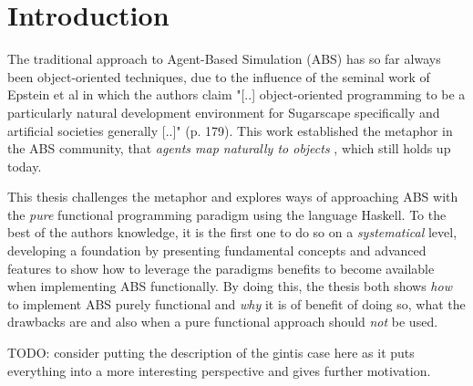 \chapter{Introduction}
\label{ch:intro}


The traditional approach to Agent-Based Simulation (ABS) has so far always been object-oriented techniques, due to the influence of the seminal work of Epstein et al \cite{epstein_growing_1996} in which the authors claim "[..] object-oriented programming to be a particularly natural development environment for Sugarscape specifically and artificial societies generally [..]" (p. 179). This work established the metaphor in the ABS community, that \textit{agents map naturally to objects} \cite{north_managing_2007}, which still holds up today. %

This thesis challenges the metaphor and explores ways of approaching ABS with the \textit{pure} functional programming paradigm using the language Haskell. To the best of the authors knowledge, it is the first one to do so on a \textit{systematical} level, developing a foundation by presenting fundamental concepts and advanced features to show how to leverage the paradigms benefits \cite{hudak_history_2007} to become available when implementing ABS functionally. By doing this, the thesis both shows \textit{how} to implement ABS purely functional and \textit{why} it is of benefit of doing so, what the drawbacks are and also when a pure functional approach should \textit{not} be used. 

\medskip

TODO: consider putting the description of the gintis case here as it puts everything into a more interesting perspective and gives further motivation.


